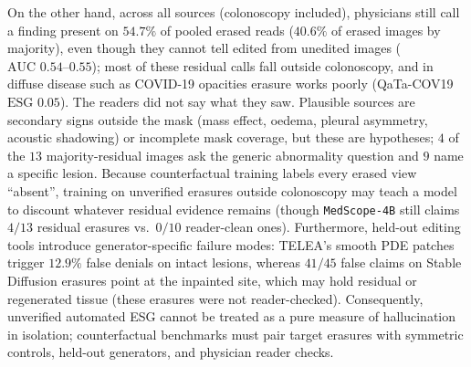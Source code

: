 \documentclass{article} %
\begin{document}
On the other hand, across all sources (colonoscopy included), physicians still call a finding present on $54.7\%$ of pooled erased reads ($40.6\%$ of erased images by majority), even though they cannot tell edited from unedited images ($\text{AUC } 0.54\text{--}0.55$); most of these residual calls fall outside colonoscopy, and in diffuse disease such as COVID-19 opacities erasure works poorly (QaTa-COV19 $\text{ESG } 0.05$). The readers did not say what they saw. Plausible sources are secondary signs outside the mask (mass effect, oedema, pleural asymmetry, acoustic shadowing) or incomplete mask coverage, but these are hypotheses; $4$ of the $13$ majority-residual images ask the generic abnormality question and $9$ name a specific lesion. Because counterfactual training labels every erased view ``absent'', training on unverified erasures outside colonoscopy may teach a model to discount whatever residual evidence remains (though \texttt{MedScope-4B} still claims $4/13$ residual erasures vs.\ $0/10$ reader-clean ones). Furthermore, held-out editing tools introduce generator-specific failure modes: TELEA's smooth PDE patches trigger $12.9\%$ false denials on intact lesions, whereas $41/45$ false claims on Stable Diffusion erasures point at the inpainted site, which may hold residual or regenerated tissue (these erasures were not reader-checked). Consequently, unverified automated ESG cannot be treated as a pure measure of hallucination in isolation; counterfactual benchmarks must pair target erasures with symmetric controls, held-out generators, and physician reader checks.
\end{document}
